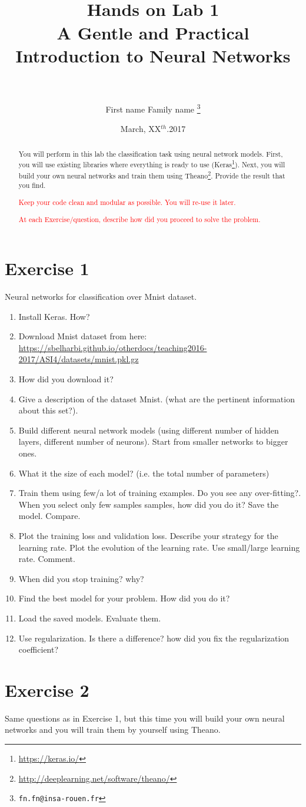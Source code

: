 \documentclass[a4paper,12pt]{article}
\title{\HRule{1.5mm} \\[0.4cm] \textbf{Hands on Lab 1\\
{\small A Gentle and Practical Introduction to Neural Networks}}\\ \HRule{0.5mm} \\[0.4cm]}
\author[1]{First name Family name \footnote{\texttt{fn.fn@insa-rouen.fr}}}
\affil[1]{Normandie Univ, UNIROUEN, INSA Rouen, LITIS, 76000 Rouen, France.}
\date{March, XX$^{th}$.2017}
\begin{document}
\maketitle 

\begin{abstract}
  You will perform in this lab the classification task using neural network models. First, you will use existing libraries where everything is ready to use (Keras\footnote{\url{https://keras.io/}}). Next, you will build your own neural networks and train them using Theano\footnote{\url{http://deeplearning.net/software/theano/}}. Provide the result that you find.
  
  \textcolor{red}{Keep your code clean and modular as possible. You will re-use it later.}
  
  \textcolor{red}{At each Exercise/question, describe how did you proceed to solve the problem.}
\end{abstract}
\section{Exercise 1}
Neural networks for classification over Mnist dataset.
\begin{enumerate}
\item Install Keras. How?
\item Download Mnist dataset from here: \url{https://sbelharbi.github.io/otherdocs/teaching2016-2017/ASI4/datasets/mnist.pkl.gz}
\item How did you download it?
\item Give a description of the dataset Mnist. (what are the pertinent information about this set?).
\item Build different neural network models (using different number of hidden layers, different number of neurons). Start from smaller networks to bigger ones.
\item What it the size of each model? (i.e. the total number of parameters)
\item Train them using few/a lot of training examples. Do you see any over-fitting?. When you select only few samples samples, how did you do it? Save the model. Compare.
\item Plot the training loss and validation loss. Describe your strategy for the learning rate. Plot the evolution of the learning rate. Use small/large learning rate. Comment. 
\item When did you stop training? why?
\item Find the best model for your problem. How did you do it?
\item Load the saved models. Evaluate them.
\item Use regularization. Is there a difference? how did you fix the regularization coefficient?
\end{enumerate}

\section{Exercise 2}
Same questions as in Exercise 1, but this time you will build your own neural networks and you will train them by yourself using Theano.
\end{document}
